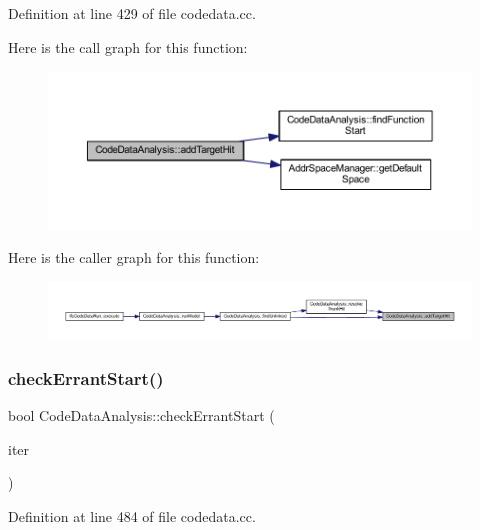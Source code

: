 Definition at line 429 of file codedata.\+cc.

Here is the call graph for this function\+:
\nopagebreak
\begin{figure}[H]
\begin{center}
\leavevmode
\includegraphics[width=350pt]{class_code_data_analysis_aa393f0d01fea19b3249d4a282bd17b52_cgraph}
\end{center}
\end{figure}
Here is the caller graph for this function\+:
\nopagebreak
\begin{figure}[H]
\begin{center}
\leavevmode
\includegraphics[width=350pt]{class_code_data_analysis_aa393f0d01fea19b3249d4a282bd17b52_icgraph}
\end{center}
\end{figure}
\mbox{\label{class_code_data_analysis_ab41f0acf673f7cff1aac362a5be63899}} 
\subsubsection{\texorpdfstring{checkErrantStart()}{checkErrantStart()}}
{\footnotesize\ttfamily bool Code\+Data\+Analysis\+::check\+Errant\+Start (\begin{DoxyParamCaption}\item[{map$<$ \mbox{\hyperlink{class_address}{Address}}, \mbox{\hyperlink{class_code_unit}{Code\+Unit}} $>$\+::iterator}]{iter }\end{DoxyParamCaption})}



Definition at line 484 of file codedata.\+cc.


